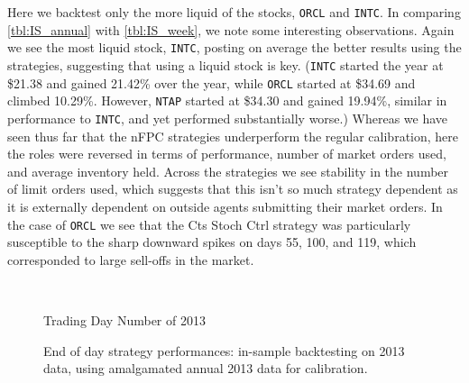 Here we backtest only the more liquid of the stocks, \texttt{ORCL} and \texttt{INTC}. In comparing \autoref{tbl:IS_annual} with \autoref{tbl:IS_week}, we note some interesting observations. Again we see the most liquid stock, \texttt{INTC}, posting on average the better results using the strategies, suggesting that using a liquid stock is key.  (\texttt{INTC} started the year at \$21.38 and gained 21.42\% over the year, while \texttt{ORCL} started at \$34.69 and climbed 10.29\%. However, \texttt{NTAP} started at \$34.30 and gained 19.94\%, similar in performance to \texttt{INTC}, and yet performed substantially worse.) Whereas we have seen thus far that the nFPC strategies underperform the regular calibration, here the roles were reversed in terms of performance, number of market orders used, and average inventory held. Across the strategies we see stability in the number of limit orders used, which suggests that this isn't so much strategy dependent as it is externally dependent on outside agents submitting their market orders. In the case of \texttt{ORCL} we see that the Cts Stoch Ctrl strategy was particularly susceptible to the sharp downward spikes on days 55, 100, and 119, which corresponded to large sell-offs in the market. 


\begin{figure}
\centering
\begin{subfigure}{.45\linewidth}
  \centering
  \setlength\figureheight{\linewidth} 
  \setlength\figurewidth{\linewidth}
  
\end{subfigure}%
\hfill%
\begin{subfigure}{.45\linewidth}
  \centering
  \setlength\figureheight{\linewidth} 
  \setlength\figurewidth{\linewidth}
   
\end{subfigure}\\

\leavevmode{}\hspace{0pt plus 1filll}\null

Trading Day Number of 2013

\vspace{1cm}
\begin{subfigure}{\linewidth}
  \setlength\figureheight{\linewidth} 
  \setlength\figurewidth{\linewidth}
  \resizebox{\linewidth}{!}{}
\end{subfigure}%
  \caption{End of day strategy performances: in-sample backtesting on 2013 data, using amalgamated annual 2013 data for calibration.}
  \label{fig:IS_annual_comp}
\end{figure}

